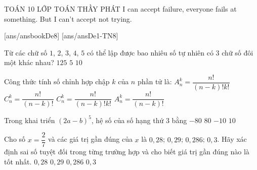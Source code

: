 \begin{name}
	{\tenchude}
	{TOÁN 10}
	{LỚP TOÁN THẦY PHÁT}
	{I can accept failure, everyone fails at something. But I can’t accept not trying.}
\end{name}
[ans/ansbookDe8]
\TN
{}[ans/ansDe1-TN8]
\begin{ex}%
Từ các chữ số $1$, $2$, $3$, $4$, $5$ có thể lập được bao nhiêu số tự nhiên có $3$ chữ số đôi một khác nhau?
 {$125$} {$5$} {$10$}
\end{ex}

\begin{ex}%
Công thức tính số chỉnh hợp chập $k$ của $n$ phần tử là:
\choice
{$A_n^k=\dfrac{n!}{\left(n-k\right)!k!}$}
{$C_n^k=\dfrac{n!}{\left(n-k\right)!}$}
{$C_n^k=\dfrac{n!}{\left(n-k\right)!k!}$}
{\True$A_n^k=\dfrac{n!}{\left(n-k\right)!}$}
\end{ex}

\begin{ex}%
Trong khai triển $\left(2a-b\right)^5$, hệ số của số hạng thứ $3$ bằng
\choice
{$-80$}
{\True $80$}
{$-10$}
{$10$}
\end{ex}

\begin{ex}%
Cho số $x = \dfrac{2}{7}$ và các giá trị gần đúng của $x$ là $0{,}28$; $0{,}29$; $0{,}286$; $0{,}3$. Hãy xác định sai số tuyệt đối trong từng trường hợp và cho biết giá trị gần đúng nào là tốt nhất.
\choice
{$0{,}28$}
{$0{,}29$}
{\True $0{,}286$}
{$0{,}3$}
\end{ex}

